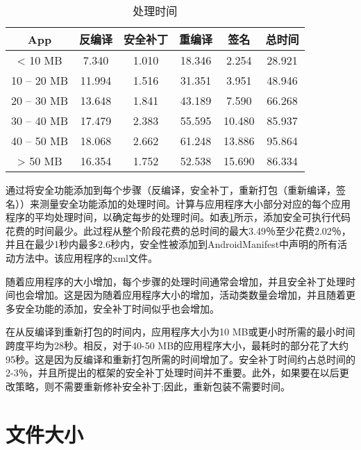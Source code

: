 		\begin{table}
			\centering
			\caption{处理时间}
			\label{tab3}
			\begin{tabular}{|c|c|c|c|c|c|}
				\hline
				App & 反编译 & 安全补丁 & 重编译 & 签名 & 总时间\\
				\hline
				< 10 MB & 7.340 & 1.010 & 18.346 & 2.254 & 28.921\\
				\hline
				10 – 20 MB & 11.994 & 1.516 & 31.351 & 3.951 & 48.946\\
				\hline
				20 – 30 MB & 13.648 & 1.841 & 43.189 & 7.590 & 66.268\\
				\hline
				30 – 40 MB & 17.479 & 2.383 & 55.595 & 10.480 & 85.937\\
				\hline
				40 – 50 MB & 18.068 & 2.662 & 61.248 & 13.886 & 95.864\\
				\hline
				> 50 MB & 16.354 & 1.752 & 52.538 & 15.690 & 86.334\\
				\hline
			\end{tabular}
		\end{table}

		通过将安全功能添加到每个步骤（反编译，安全补丁，重新打包（重新编译，签名））来测量安全功能添加的处理时间。计算与应用程序大小部分对应的每个应用程序的平均处理时间，以确定每步的处理时间。如表\ref{tab3}所示，添加安全可执行代码花费的时间最少。此过程从整个阶段花费的总时间的最大3.49％至少花费2.02％，并且在最少1秒内最多2.6秒内，安全性被添加到AndroidManifest中声明的所有活动方法中。该应用程序的xml文件。

		随着应用程序的大小增加，每个步骤的处理时间通常会增加，并且安全补丁处理时间也会增加。这是因为随着应用程序大小的增加，活动类数量会增加，并且随着更多安全功能的添加，安全补丁时间似乎也会增加。

		在从反编译到重新打包的时间内，应用程序大小为10 MB或更小时所需的最小时间跨度平均为28秒。相反，对于40-50 MB的应用程序大小，最耗时的部分花了大约95秒。这是因为反编译和重新打包所需的时间增加了。安全补丁时间约占总时间的2-3％，并且所提出的框架的安全补丁处理时间并不重要。此外，如果要在以后更改策略，则不需要重新修补安全补丁;因此，重新包装不需要时间。
		
	\section{文件大小}
	
